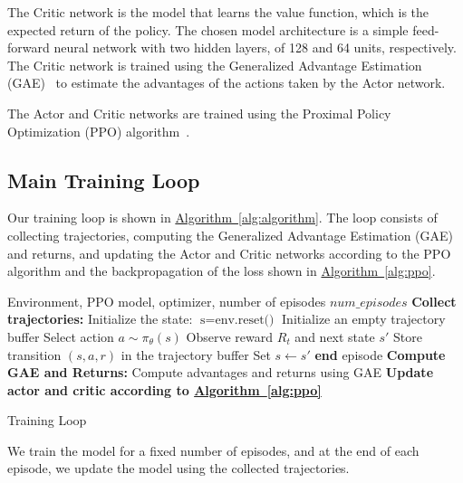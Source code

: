 The Critic network is the model that learns the value function, which is the expected return of the policy.
The chosen model architecture is a simple feed-forward neural network with two hidden layers, of 128 and 64 units, respectively.
The Critic network is trained using the Generalized Advantage Estimation (GAE)~\cite{Schulman2015} to estimate the advantages of the actions taken by the Actor network.

The Actor and Critic networks are trained using the Proximal Policy Optimization (PPO) algorithm~\cite{Schulman2017}.

\subsection{Main Training Loop}
\label{subsec:main-training-loop}

Our training loop is shown in \hyperref[alg:algorithm]{Algorithm~\ref{alg:algorithm}}.
The loop consists of collecting trajectories, computing the Generalized Advantage Estimation (GAE) and returns,
and updating the Actor and Critic networks according to the PPO algorithm and the backpropagation of the loss
shown in \hyperref[alg:ppo]{Algorithm~\ref{alg:ppo}}.

\begin{algorithm}[H]
    \begin{algorithmic}[1]
        \Require Environment, PPO model, optimizer, number of episodes $num\_episodes$
            \State \textbf{Collect trajectories:}
            \State \hspace{1em} Initialize the state: $\text{s} = \text{env.reset()}$
            \State \hspace{1em} Initialize an empty trajectory buffer
                \State \hspace{1em} Select action $a \sim \pi_{\theta}(s)$
                \State \hspace{1em} Observe reward $R_t$ and next state $s'$
                \State \hspace{1em} Store transition $(s, a, r)$ in the trajectory buffer
                \State \hspace{1em} Set $s \leftarrow s'$
                    \State \hspace{1em} \textbf{end} episode
                \EndIf
            \EndFor
            \State \textbf{Compute GAE and Returns:}
            \State \hspace{1em} Compute advantages and returns using GAE
            \State \textbf{Update actor and critic according to \hyperref[alg:algorithm]{Algorithm~\ref{alg:ppo}}}
        \EndFor
    \end{algorithmic}
    \caption{Training Loop}
    \label{alg:algorithm}
\end{algorithm}

We train the model for a fixed number of episodes, and at the end of each episode, we update the model using the collected trajectories.


%

